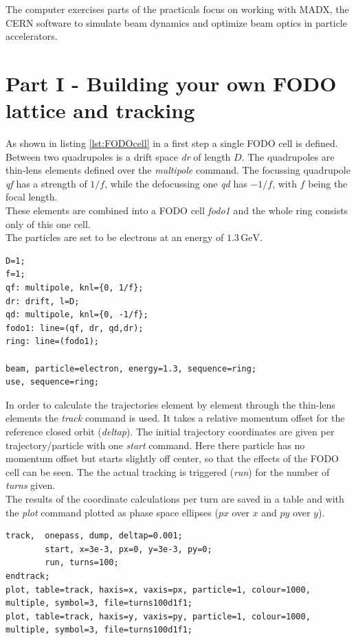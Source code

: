 The computer exercises parts of the practicals focus on working with MADX, the CERN software to simulate beam dynamics and optimize beam optics in particle accelerators.
\section{Part I - Building your own FODO lattice and tracking}
As shown in listing \ref{lst:FODOcell} in a first step a single FODO cell is defined. Between two quadrupoles is a drift space \textit{dr} of length $D$. The quadrupoles are thin-lens elements defined over the \textit{multipole} command. The focussing quadrupole \textit{qf} has a strength of $1/f$, while the defocussing one \textit{qd} has $-1/f$, with $f$ being the focal length.\\
These elements are combined into a FODO cell \textit{fodo1} and the whole ring consists only of this one cell.\\
The particles are set to be electrons at an energy of $1.3\mathrm{\,GeV}$.

\begin{lstlisting}[caption=Defining the FODO cell,label={lst:FODOcell}]
D=1;
f=1;
qf: multipole, knl={0, 1/f};
dr: drift, l=D;
qd: multipole, knl={0, -1/f};
fodo1: line=(qf, dr, qd,dr);
ring: line=(fodo1);

beam, particle=electron, energy=1.3, sequence=ring;
use, sequence=ring;
\end{lstlisting}

In order to calculate the trajectories element by element through the thin-lens elements the \textit{track} command is used. It takes a relative momentum offset for the reference closed orbit (\textit{deltap}). The initial trajectory coordinates are given per trajectory/particle with one \textit{start} command. Here there particle has no momentum offset but starts slightly off center, so that the effects of the FODO cell can be seen.
The the actual tracking is triggered (\textit{run}) for the number of \textit{turns} given.\\
The results of the coordinate calculations per turn are saved in a table and with the \textit{plot} command plotted as phase space ellipses ($px$ over $x$ and $py$ over $y$).

\begin{lstlisting}[caption=Tracking,label={lst:tracking}]
track,  onepass, dump, deltap=0.001;
        start, x=3e-3, px=0, y=3e-3, py=0;
        run, turns=100;
endtrack;
plot, table=track, haxis=x, vaxis=px, particle=1, colour=1000, multiple, symbol=3, file=turns100d1f1;
plot, table=track, haxis=y, vaxis=py, particle=1, colour=1000, multiple, symbol=3, file=turns100d1f1;
\end{lstlisting}

